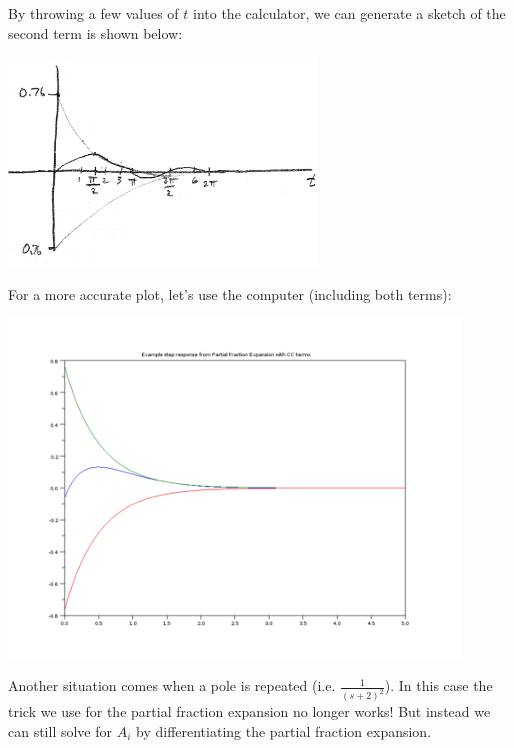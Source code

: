 \begin{ExampleCont}
By throwing a few values of $t$ into the calculator, we can generate a sketch of the second term is shown below:

\includegraphics[width=82mm]{figs01/00805a.png}

For a more accurate plot, let's use the computer (including both terms):

\includegraphics[width=120mm]{figs01/pf_compConja.png}


\end{ExampleCont}


Another situation comes when a pole is repeated (i.e. $\frac{1}{(s+2)^2}$).  In this case the trick we use for the partial fraction expansion no longer works!   But instead we can still solve for $A_i$ by differentiating the partial fraction expansion.

